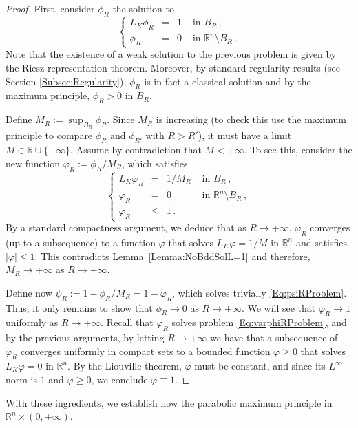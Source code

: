 \documentclass[12pt,reqno]{amsart}
\theoremstyle{definition}
\theoremstyle{remark}
\newcommand{\con}[1]{\mathbb{#1}}
\newcommand{\R}{\con{R}} %
\newcommand\beqc[1]{\left\{\begin{array}{#1}}
\newcommand\eeqc{\end{array} \right.}
\def\PDEsystem{rcll}
\numberwithin{equation}{section}
\begin{document}
\begin{proof}
	First, consider $\phi_R$ the solution to
	\begin{equation*}
	\beqc{\PDEsystem}
	L_K  \phi_R &=& 1 & \textrm{ in } B_R\,,\\
	\phi_R &=& 0 & \textrm{ in } \R^n\setminus B_R\,.
	\eeqc
	\end{equation*}
	Note that the existence of a weak solution to the previous problem is given by the Riesz representation theorem. Moreover, by standard regularity results (see Section \ref{Subsec:Regularity}), $\phi_R$ is in fact a classical solution and by the maximum principle, $\phi_R>0$ in $B_R$.
	
	Define $M_R := \sup_{B_R} \phi_R$. Since $M_R$ is increasing (to check this use the maximum principle to compare $\phi_R$ and $\phi_{R'}$ with $R>R'$), it must have a limit $M\in \R \cup \{+\infty\}$. Assume by contradiction that $M<+\infty$. To see this, consider the new function $ \varphi_R := \phi_R/M_R$, which satisfies
	\begin{equation}
	\label{Eq:varphiRProblem}
	\beqc{\PDEsystem}
	L_K  \varphi_R &=& 1/M_R & \textrm{ in } B_R\,,\\
	\varphi_R &=& 0 & \textrm{ in } \R^n\setminus B_R\,, \\
	\varphi_R &\leq & 1\,.
	\eeqc
	\end{equation}
	By a standard compactness argument, we deduce that as $R\to +\infty$, $\varphi_R$ converges (up to a subsequence) to a function $\varphi$ that solves $L_K  \varphi = 1/M$ in $\R^n$ and satisfies  $|\varphi| \leq 1$. This contradicts Lemma~\ref{Lemma:NoBddSolL=1} and therefore, $M_R \to +\infty$ as $R\to +\infty$. 
	
	Define now $\psi_R := 1-\phi_R/M_R = 1-\varphi_R$, which solves trivially \eqref{Eq:psiRProblem}. Thus, it only remains to show that $\phi_R \to 0$ as $R\to +\infty$. We will see that $\varphi_R \to	1$ uniformly as $R\to +\infty$. Recall that $\varphi_R$ solves problem \eqref{Eq:varphiRProblem}, and by the previous arguments, by letting $R\to +\infty$ we have that a subsequence of $\varphi_R$ converges uniformly in compact sets to a bounded function $\varphi\geq 0$ that solves $ L_K \varphi = 0 $ in $\R^n$. By the Liouville theorem, $\varphi$ must be constant, and since its $L^\infty$ norm is $1$ and $\varphi\geq 0$, we conclude $\varphi\equiv 1$.	
\end{proof}

With these ingredients, we establish now the parabolic maximum principle in $\R^n \times (0,+\infty)$. 
\end{document}
